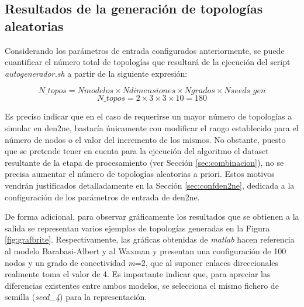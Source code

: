 \subsection{Resultados de la generación de topologías aleatorias}
\label{sec:gentopo}

Considerando los parámetros de entrada configurados anteriormente, se puede cuantificar el número total de topologías que resultará de la ejecución del script \textit{autogenerador.sh} a partir de la siguiente expresión:

    \[\textit{N\_topos} = \textit{Nmodelos} \times \textit{Ndimensiones}
    \times \textit{Ngrados} \times \textit{Nseeds\_gen}\]
    \[\textit{N\_topos} = 2 \times 3 \times 3 \times 10 = 180\]

\vspace{3mm}

Es preciso indicar que en el caso de requerirse un mayor número de topologías a simular en \gls{den2ne}, bastaría únicamente con modificar el rango establecido para el número de nodos o el valor del incremento de los mismos. No obstante, puesto que se pretende tener en cuenta para la ejecución del algoritmo el dataset resultante de la etapa de procesamiento (ver Sección \ref{sec:combinacion}), no se precisa aumentar el número de topologías aleatorias a priori. Estos motivos vendrán justificados detalladamente en la Sección \ref{sec:confden2ne}, dedicada a la configuración de los parámetros de entrada de \gls{den2ne}.

\vspace{3mm}

De forma adicional, para observar gráficamente los resultados que se obtienen a la salida se representan varios ejemplos de topologías generadas en la Figura \ref{fig:grafbrite}. Respectivamente, las gráficas obtenidas de \textit{matlab} hacen referencia al modelo Barabasi-Albert y al Waxman y presentan una configuración de 100 nodos y un grado de conectividad \textit{m}=2, que al suponer enlaces direccionales realmente toma el valor de 4. Es importante indicar que, para apreciar las diferencias existentes entre ambos modelos, se selecciona el mismo fichero de semilla (\textit{seed\_4}) para la representación.

\vspace{3mm}

